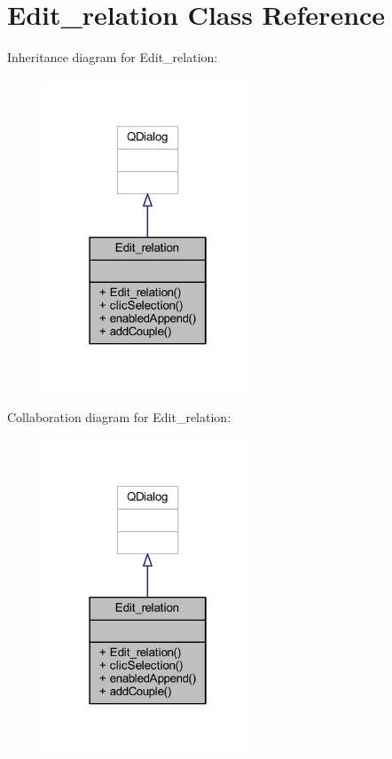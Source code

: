 \hypertarget{class_edit__relation}{}\section{Edit\+\_\+relation Class Reference}
\label{class_edit__relation}


Inheritance diagram for Edit\+\_\+relation\+:\nopagebreak
\begin{figure}[H]
\begin{center}
\leavevmode
\includegraphics[width=178pt]{class_edit__relation__inherit__graph}
\end{center}
\end{figure}


Collaboration diagram for Edit\+\_\+relation\+:\nopagebreak
\begin{figure}[H]
\begin{center}
\leavevmode
\includegraphics[width=178pt]{class_edit__relation__coll__graph}
\end{center}
\end{figure}
